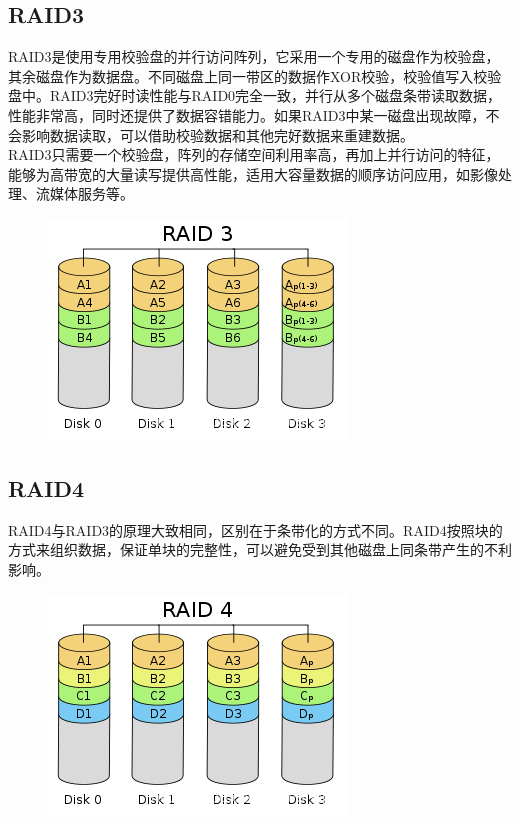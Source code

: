 \vspace{0.5cm}

\subsection{RAID3}

RAID3是使用专用校验盘的并行访问阵列，它采用一个专用的磁盘作为校验盘，其余磁盘作为数据盘。不同磁盘上同一带区的数据作XOR校验，校验值写入校验盘中。RAID3完好时读性能与RAID0完全一致，并行从多个磁盘条带读取数据，性能非常高，同时还提供了数据容错能力。如果RAID3中某一磁盘出现故障，不会影响数据读取，可以借助校验数据和其他完好数据来重建数据。\\

RAID3只需要一个校验盘，阵列的存储空间利用率高，再加上并行访问的特征，能够为高带宽的大量读写提供高性能，适用大容量数据的顺序访问应用，如影像处理、流媒体服务等。

\begin{figure}[H]
    \centering
    \includegraphics[scale=0.9]{img/C4/4-5/4.png}
\end{figure}

\vspace{0.5cm}

\subsection{RAID4}

RAID4与RAID3的原理大致相同，区别在于条带化的方式不同。RAID4按照块的方式来组织数据，保证单块的完整性，可以避免受到其他磁盘上同条带产生的不利影响。

\begin{figure}[H]
    \centering
    \includegraphics[scale=0.9]{img/C4/4-5/5.png}
\end{figure}

